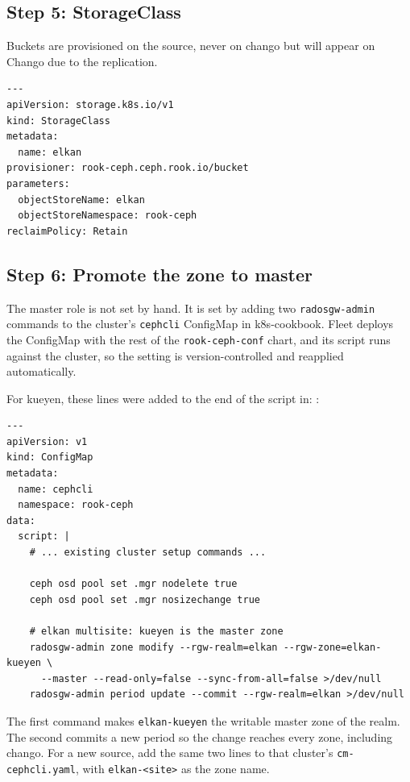 \subsection{Step 5: StorageClass}

Buckets are provisioned on the source, never on chango but will appear on Chango due to the replication.

{\small
\begin{verbatim}
---
apiVersion: storage.k8s.io/v1
kind: StorageClass
metadata:
  name: elkan
provisioner: rook-ceph.ceph.rook.io/bucket
parameters:
  objectStoreName: elkan
  objectStoreNamespace: rook-ceph
reclaimPolicy: Retain
\end{verbatim}
}

\subsection{Step 6: Promote the zone to master}

The master role is not set by hand. It is set by adding two \texttt{radosgw-admin} commands to the cluster's \texttt{cephcli} ConfigMap in k8s-cookbook. Fleet deploys the ConfigMap with the rest of the \texttt{rook-ceph-conf} chart, and its script runs against the cluster, so the setting is version-controlled and reapplied automatically.

For kueyen, these lines were added to the end of the script in:
:

{\small
\begin{verbatim}
---
apiVersion: v1
kind: ConfigMap
metadata:
  name: cephcli
  namespace: rook-ceph
data:
  script: |
    # ... existing cluster setup commands ...

    ceph osd pool set .mgr nodelete true
    ceph osd pool set .mgr nosizechange true

    # elkan multisite: kueyen is the master zone
    radosgw-admin zone modify --rgw-realm=elkan --rgw-zone=elkan-kueyen \
      --master --read-only=false --sync-from-all=false >/dev/null
    radosgw-admin period update --commit --rgw-realm=elkan >/dev/null
\end{verbatim}
}

The first command makes \texttt{elkan-kueyen} the writable master zone of the realm. The second commits a new period so the change reaches every zone, including chango. For a new source, add the same two lines to that cluster's \texttt{cm-cephcli.yaml}, with \texttt{elkan-<site>} as the zone name.

